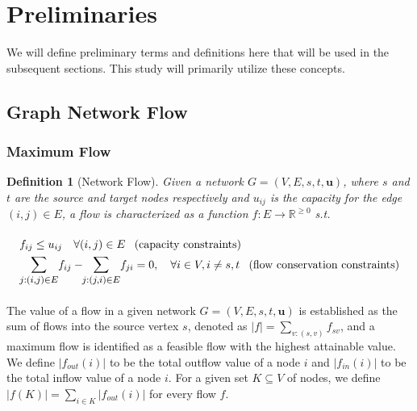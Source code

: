 \documentclass{article} %
\theoremstyle{bfnote}
\newtheorem{definition}[theorem]{Definition}
\begin{document}
\section{Preliminaries}
We will define preliminary terms and definitions here that will be used in the subsequent sections. This study will primarily utilize these concepts.

\subsection{Graph Network Flow}

\subsubsection{Maximum Flow}
\begin{definition}[Network Flow]
	Given a network $G=(V, E, s, t, \bm{u})$, where $s$ and $t$ are the source and target nodes respectively and $u_{i j}$ is the capacity for the edge $(i,j)\in E$, a flow is characterized as a function \( f: E \rightarrow \mathbb{R}^{\geq 0} \) s.t.
	
	\begin{equation}
		\arraycolsep=3pt
		\def\arraystretch{1.5}
		\begin{array}{ll}
			f_{i j} \leq u_{i j} \quad \forall(i, j) \in E \hspace{8pt} \text{(capacity constraints)} \\
			\vspace{4pt}
			\mathlarger{\mathlarger{\sum\limits_{j:(i, j) \in E}}} f_{i j} - \hspace{-3pt} \mathlarger{\mathlarger{\sum\limits_{j:(j, i) \in E}}} f_{j i} = 0, \quad \forall i \in V, i \neq s, t \hspace{8pt} \text{(flow conservation constraints)}
		\end{array}
		\label{eq:1}
	\end{equation}
\end{definition}
	
The value of a flow in a given network \( G = (V, E, s, t, \bm{u}) \) is established as the sum of flows into the source vertex \( s \), denoted as \( |f| = \sum_{v:(s, v)} f_{s v} \), and a maximum flow is identified as a feasible flow with the highest attainable value. We define $\left|f_{out}(i)\right|$ to be the total outflow value of a node $i$ and $\left|f_{in}(i)\right|$ to be the total inflow value of a node $i$. For a given set $K \subseteq V$ of nodes, we define $|f(K)|= \sum_{i \in K}|f_{out}(i)|$ for every flow $f$.
\end{document}
